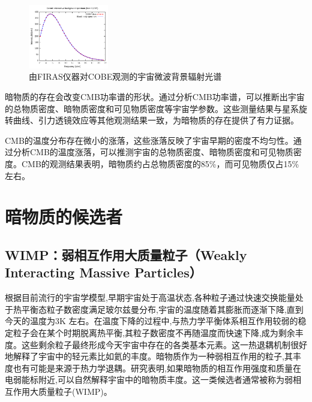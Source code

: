 \documentclass{beamer} %
\begin{document}
\begin{frame}
\begin{figure}[!htbp]
    \centering    
    \includegraphics[height=2.8cm]{Img/2-3.png}
    \caption{由FIRAS仪器对COBE观测的宇宙微波背景辐射光谱 }
    \label{2-3}
\end{figure}

暗物质的存在会改变CMB功率谱的形状。通过分析CMB功率谱，可以推断出宇宙的总物质密度、暗物质密度和可见物质密度等宇宙学参数。这些测量结果与星系旋转曲线、引力透镜效应等其他观测结果一致，为暗物质的存在提供了有力证据。

CMB的温度分布存在微小的涨落，这些涨落反映了宇宙早期的密度不均匀性。通过分析CMB的温度涨落，可以推测宇宙的总物质密度、暗物质密度和可见物质密度。CMB的观测结果表明，暗物质约占总物质密度的85\%，而可见物质仅占15\%左右。
\end{frame}

\section{暗物质的候选者}

\subsection{WIMP：弱相互作用大质量粒子（Weakly Interacting Massive Particles）}

\begin{frame}
根据目前流行的宇宙学模型,早期宇宙处于高温状态,各种粒子通过快速交换能量处于热平衡态粒子数密度满足玻尔兹曼分布,宇宙的温度随着其膨胀而逐渐下降,直到今天的温度为3K 左右。在温度下降的过程中,与热力学平衡体系相互作用较弱的稳定粒子会在某个时期脱离热平衡,其粒子数密度不再随温度而快速下降,成为剩余丰度。这些剩余粒子最终形成今天宇宙中存在的各类基本元素。这一热退耦机制很好地解释了宇宙中的轻元素比如氦的丰度。暗物质作为一种弱相互作用的粒子,其丰度也有可能是来源于热力学退耦。研究表明,如果暗物质的相互作用强度和质量在电弱能标附近,可以自然解释宇宙中的暗物质丰度。这一类候选者通常被称为弱相互作用大质量粒子(WIMP)。
\end{frame}
\end{document}
